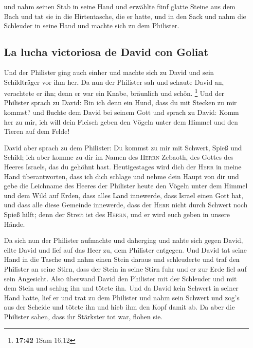  und nahm seinen Stab in seine Hand und erwählte fünf
glatte Steine aus dem Bach und tat sie in die Hirtentasche, die er
hatte, und in den Sack und nahm die Schleuder in seine Hand und machte
sich zu dem Philister.

\hypertarget{la-lucha-victoriosa-de-david-con-goliat}{%
\subsection{La lucha victoriosa de David con
Goliat}\label{la-lucha-victoriosa-de-david-con-goliat}}

 Und der Philister ging auch einher und machte sich zu
David und sein Schildträger vor ihm her.  Da nun der
Philister sah und schaute David an, verachtete er ihn; denn er war ein
Knabe, bräunlich und schön. \footnote{\textbf{17:42} 1Sam 16,12}
 Und der Philister sprach zu David: Bin ich denn ein
Hund, dass du mit Stecken zu mir kommst? und fluchte dem David bei
seinem Gott  und sprach zu David: Komm her zu mir, ich
will dein Fleisch geben den Vögeln unter dem Himmel und den Tieren auf
dem Felde!

 David aber sprach zu dem Philister: Du kommst zu mir mit
Schwert, Spieß und Schild; ich aber komme zu dir im Namen des
\textsc{Herrn} Zebaoth, des Gottes des Heeres Israels, das du gehöhnt
hast.  Heutigestages wird dich der \textsc{Herr} in meine
Hand überantworten, dass ich dich schlage und nehme dein Haupt von dir
und gebe die Leichname des Heeres der Philister heute den Vögeln unter
dem Himmel und dem Wild auf Erden, dass alles Land innewerde, dass
Israel einen Gott hat,  und dass alle diese Gemeinde
innewerde, dass der \textsc{Herr} nicht durch Schwert noch Spieß hilft;
denn der Streit ist des \textsc{Herrn}, und er wird euch geben in unsere
Hände.

 Da sich nun der Philister aufmachte und daherging und
nahte sich gegen David, eilte David und lief auf das Heer zu, dem
Philister entgegen.  Und David tat seine Hand in die
Tasche und nahm einen Stein daraus und schleuderte und traf den
Philister an seine Stirn, dass der Stein in seine Stirn fuhr und er zur
Erde fiel auf sein Angesicht.  Also überwand David den
Philister mit der Schleuder und mit dem Stein und schlug ihn und tötete
ihn. Und da David kein Schwert in seiner Hand hatte, 
lief er und trat zu dem Philister und nahm sein Schwert und zog's aus
der Scheide und tötete ihn und hieb ihm den Kopf damit ab. Da aber die
Philister sahen, dass ihr Stärkster tot war, flohen sie.

